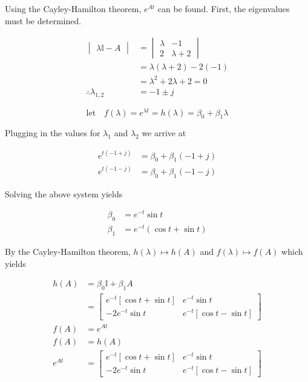 \noindent Using the Cayley-Hamilton theorem, $e^{At}$ can be found. First, the
eigenvalues must be determined.

\begin{align}
  \begin{vmatrix}
    \lambda \mathbb{I} - A
  \end{vmatrix} \nonumber
  &=
  \begin{vmatrix}
    \lambda & -1 \\
    2       & \lambda + 2
  \end{vmatrix} \\
  &= \lambda (\lambda + 2) - 2 (-1) \nonumber \\
  &= \lambda^2 + 2 \lambda + 2 = 0 \nonumber \\
  \therefore \lambda_{1,2} &= -1 \pm j \label{eq:q5_lambda}
\end{align}

\begin{equation}
  \text{let} \quad
  f(\lambda) = e^{\lambda t} =
  h(\lambda) = \beta_0 + \beta_1 \lambda
\end{equation}

\noindent Plugging in the values for $\lambda_1$ and $\lambda_2$ we arrive at

\begin{align}
  e^{t(-1 + j)} &= \beta_0 + \beta_1 (-1 + j) \nonumber \\
  e^{t(-1 - j)} &= \beta_0 + \beta_1 (-1 - j)  \nonumber
\end{align}

Solving the above system yields

\begin{align}
  \beta_0 &= e^{-t} \sin t \label{eq:q5_beta0} \\
  \beta_1 &= e^{-t}(\cos t + \sin t) \label{eq:q5_beta1}
\end{align}

\noindent By the Cayley-Hamilton theorem, $h(\lambda) \mapsto h(A)$ and
$f(\lambda) \mapsto f(A)$ which yields

\begin{align}
h(A) &= \beta_0 \mathbb{I} + \beta_1 A \nonumber \\
     &=
   \begin{bmatrix}
     e^{-t} [\cos t + \sin t] & e^{-t} \sin t \\
     -2 e^{-t} \sin t & e^{-t} [\cos t - \sin t]
   \end{bmatrix} \nonumber \\
f(A) &= e^{At} \nonumber \\
f(A) &= h(A) \nonumber \\
e^{At} &=
   \begin{bmatrix}
     e^{-t} [\cos t + \sin t] & e^{-t} \sin t \\
     -2 e^{-t} \sin t & e^{-t} [\cos t - \sin t]
   \end{bmatrix}
\end{align}

